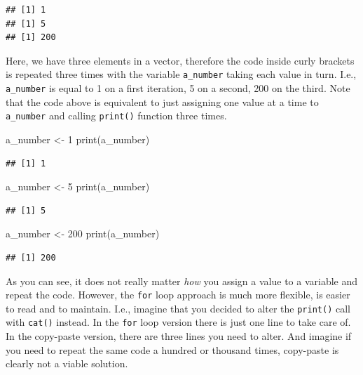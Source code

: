\documentclass[
]{book}
\newenvironment{Shaded}{\begin{snugshade}}{\end{snugshade}}
\newcommand{\DecValTok}[1]{\textcolor[rgb]{0.00,0.00,0.81}{#1}}
\newcommand{\FunctionTok}[1]{\textcolor[rgb]{0.00,0.00,0.00}{#1}}
\newcommand{\NormalTok}[1]{#1}
\newcommand{\OtherTok}[1]{\textcolor[rgb]{0.56,0.35,0.01}{#1}}
\begin{document}
\begin{verbatim}
## [1] 1
## [1] 5
## [1] 200
\end{verbatim}

Here, we have three elements in a vector, therefore the code inside curly brackets is repeated three times with the variable \texttt{a\_number} taking each value in turn. I.e., \texttt{a\_number} is equal to 1 on a first iteration, 5 on a second, 200 on the third. Note that the code above is equivalent to just assigning one value at a time to \texttt{a\_number} and calling \texttt{print()} function three times.

\begin{Shaded}
\begin{Highlighting}[]
\NormalTok{a\_number }\OtherTok{\textless{}{-}} \DecValTok{1} 
\FunctionTok{print}\NormalTok{(a\_number)}
\end{Highlighting}
\end{Shaded}

\begin{verbatim}
## [1] 1
\end{verbatim}

\begin{Shaded}
\begin{Highlighting}[]
\NormalTok{a\_number }\OtherTok{\textless{}{-}} \DecValTok{5}
\FunctionTok{print}\NormalTok{(a\_number)}
\end{Highlighting}
\end{Shaded}

\begin{verbatim}
## [1] 5
\end{verbatim}

\begin{Shaded}
\begin{Highlighting}[]
\NormalTok{a\_number }\OtherTok{\textless{}{-}} \DecValTok{200}
\FunctionTok{print}\NormalTok{(a\_number)}
\end{Highlighting}
\end{Shaded}

\begin{verbatim}
## [1] 200
\end{verbatim}

As you can see, it does not really matter \emph{how} you assign a value to a variable and repeat the code. However, the \texttt{for} loop approach is much more flexible, is easier to read and to maintain. I.e., imagine that you decided to alter the \texttt{print()} call with \texttt{cat()} instead. In the \texttt{for} loop version there is just one line to take care of. In the copy-paste version, there are three lines you need to alter. And imagine if you need to repeat the same code a hundred or thousand times, copy-paste is clearly not a viable solution.
\end{document}
